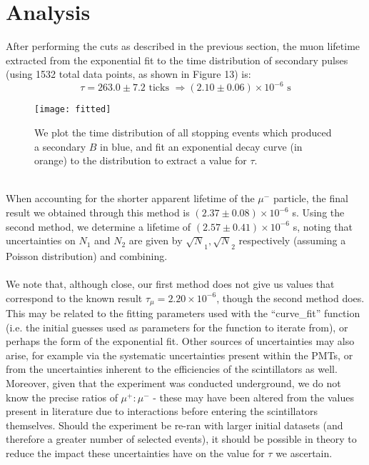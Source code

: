 \documentclass[a4paper]{article}
\begin{document}
\section{Analysis}%
After performing the cuts as described in the previous section, the muon lifetime extracted from the exponential fit to the time distribution of secondary pulses (using 1532 total data points, as shown in Figure 13) is:
\begin{equation*}
	\tau = 263.0 \pm 7.2 \text{ ticks } \Rightarrow (2.10 \pm 0.06) \times 10^{-6}\text{ s}
\end{equation*}
\begin{figure}[h!]
\begin{center}
	\texttt{[image: fitted]}
\end{center}
\caption{We plot the time distribution of all stopping events which produced a secondary $B$ in blue, and fit an exponential decay curve (in orange) to the distribution to extract a value for $\tau$. }
\end{figure}
\\
When accounting for the shorter apparent lifetime of the $\mu^-$ particle,
the final result we obtained through this method is $(2.37 \pm 0.08) \times 10^{-6}$ s. 
Using the second method, we determine a lifetime of $(2.57 \pm 0.41) \times 10^{-6}$ s, noting that uncertainties on $N_1$ and $N_2$ are given by $\sqrt N_1, \sqrt N_2$ respectively (assuming a Poisson distribution) and combining.
\\\\
We note that, although close, our first method does not give us values that correspond to the known result $\tau_\mu = 2.20 \times 10^{-6}$, though the second method does.
This may be related to the fitting parameters used with the ``curve\_fit'' function (i.e. the initial guesses used as parameters for the function to iterate from),
or perhaps the form of the exponential fit.
Other sources of uncertainties may also arise,
for example via the systematic uncertainties present within the PMTs, or from the uncertainties inherent to the efficiencies of the scintillators as well. 
Moreover, given that the experiment was conducted underground, we do not know the precise ratios of $\mu^+:\mu^-$ - these may have been altered from the values present in literature due to interactions before entering the scintillators themselves. 
Should the experiment be re-ran with larger initial datasets (and therefore a greater number of selected events), it should be possible in theory to reduce the impact these uncertainties have on the value for $\tau$ we ascertain. 
\end{document}
